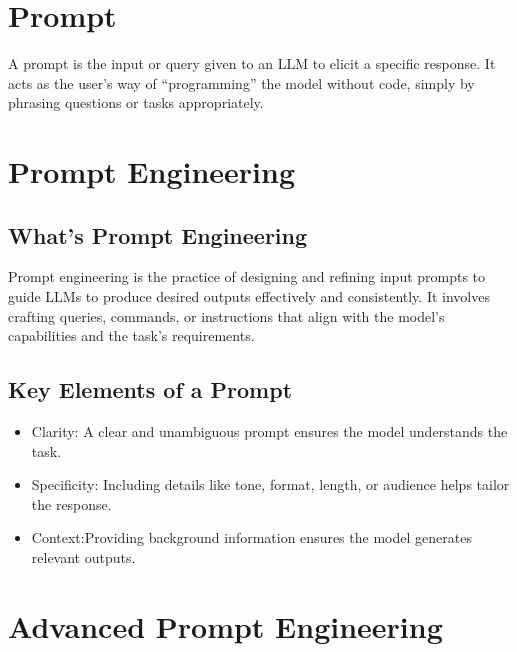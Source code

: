 \documentclass[letterpaper,11pt,english]{sphinxmanual}
\begin{document}
\section{Prompt}
\label{\detokenize{prompt:id1}}
\sphinxAtStartPar
A prompt is the input or query given to an LLM to elicit a specific response.
It acts as the user’s way of “programming” the model without code, simply by
phrasing questions or tasks appropriately.


\section{Prompt Engineering}
\label{\detokenize{prompt:id2}}

\subsection{What’s Prompt Engineering}
\label{\detokenize{prompt:what-s-prompt-engineering}}
\sphinxAtStartPar
Prompt engineering is the practice of designing and refining input prompts to
guide LLMs to produce desired outputs effectively and consistently.
It involves crafting queries, commands, or instructions that align with
the model’s capabilities and the task’s requirements.


\subsection{Key Elements of a Prompt}
\label{\detokenize{prompt:key-elements-of-a-prompt}}\begin{itemize}
\item {} 
\sphinxAtStartPar
Clarity: A clear and unambiguous prompt ensures the model understands the task.

\item {} 
\sphinxAtStartPar
Specificity: Including details like tone, format, length, or audience helps tailor the response.

\item {} 
\sphinxAtStartPar
Context:Providing background information ensures the model generates relevant outputs.

\end{itemize}


\section{Advanced Prompt Engineering}
\label{\detokenize{prompt:advanced-prompt-engineering}}
\end{document}
